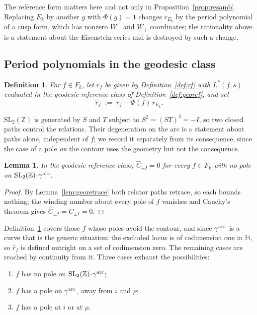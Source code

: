 \documentclass[11pt]{article}
\newtheorem{lemma}[theorem]{Lemma}
\newtheorem{definition}[theorem]{Definition}
\newcommand{\HH}{\mathbb{H}}
\newcommand{\ZZ}{\mathbb{Z}}
\newcommand{\SLZ}{\mathrm{SL}_2(\ZZ)}
\begin{document}
The reference form matters here and not only in Proposition~\ref{prop:resamb}. Replacing $E_k$ by
another $g$ with $\Phi(g)=1$ changes $r_{E_k}$ by the period polynomial of a cusp form, which has
nonzero $W_-$ and $W_+$ coordinates; the rationality above is a statement about the Eisenstein
series and is destroyed by such a change.

\subsection{Period polynomials in the geodesic class}\label{sec:arcperiod}

\begin{definition}\label{def:rfhat}
For $f\in F_k$, let $r_f$ be given by Definition~\ref{def:rf} with $L^*(f,s)$ evaluated in the
geodesic reference class of Definition~\ref{def:georef}, and set
\begin{equation}\label{eq:rfhat}
\hat r_f\;:=\;r_f-\Phi(f)\,r_{E_k}.
\end{equation}
\end{definition}

$\SLZ$ is generated by $S$ and $T$ subject to $S^2=(ST)^3=-I$, so two closed paths control the
relations. Their degeneration on the arc is a statement about paths alone, independent of $f$; we
record it separately from its consequence, since the case of a pole \emph{on} the contour uses the
geometry but not the consequence.

\begin{lemma}\label{lem:geoloops}
In the geodesic reference class, $\hat C_{\pm I}=0$ for every $f\in F_k$ with no pole on
$\SLZ\!\cdot\!\gamma^{\rm arc}$.
\end{lemma}

\begin{proof}
By Lemma~\ref{lem:georetrace} both relator paths retrace, so each bounds nothing; the winding
number about every pole of $f$ vanishes and Cauchy's theorem gives $\hat C_{\pm I}=C_{\pm I}=0$.
\end{proof}

Definition~\ref{def:rfhat} covers those $f$ whose poles avoid the contour, and since
$\gamma^{\rm arc}$ is a curve that is the generic situation: the excluded locus is of codimension
one in $\HH$, so $\hat r_f$ is defined outright on a set of codimension zero. The remaining cases
are reached by continuity from it. Three cases exhaust the possibilities:
\begin{enumerate}
\item $f$ has no pole on $\SLZ\!\cdot\!\gamma^{\rm arc}$;
\item $f$ has a pole on $\gamma^{\rm arc}$, away from $i$ and $\rho$;
\item $f$ has a pole at $i$ or at $\rho$.
\end{enumerate}
\end{document}
